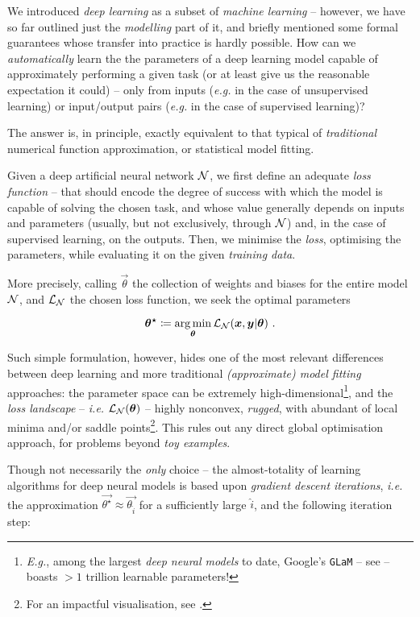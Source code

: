 We introduced \textit{deep learning} as a subset of \textit{machine learning} -- however, we have so far outlined just the \textit{modelling} part of it, and briefly mentioned some formal guarantees whose transfer into practice is hardly possible. How can we \textit{automatically} learn the the parameters of a deep learning model capable of approximately performing a given task (or at least give us the reasonable expectation it could) -- only from inputs (\textit{e.g.} in the case of unsupervised learning) or input/output pairs (\textit{e.g.} in the case of supervised learning)?

The answer is, in principle, exactly equivalent to that typical of \textit{traditional} numerical function approximation, or statistical model fitting.

Given a deep artificial neural network $\mathcal{N}$, we first define an adequate \textit{loss function} -- that should encode the degree of success with which the model is capable of solving the chosen task, and whose value generally depends on inputs and parameters (usually, but not exclusively, through $\mathcal{N}$) and, in the case of supervised learning, on the outputs. Then, we minimise the \textit{loss}, optimising \wrt the parameters, while evaluating it on the given \textit{training data}.

More precisely, calling $\vec{\theta}$ the collection of weights and biases for the entire model $\mathcal{N}$, and $\mathcal{L}_{\mathcal{N}}$ the chosen loss function, we seek the optimal parameters

$$\bm{\theta^{\star}} \coloneqq \operatorname*{arg\,min}_{\bm{\theta}} \mathcal{L}_{\mathcal{N}}(\bm{x}, \bm{y} | \bm{\theta}) \text{ .}$$

Such simple formulation, however, hides one of the most relevant differences between deep learning and more traditional \textit{(approximate) model fitting} approaches: the parameter space can be extremely high-dimensional\footnote{\textit{E.g.}, among the largest \textit{deep neural models} to date, Google's \texttt{GLaM} -- see \cite{DuEtAl2022GLaM} -- boasts $>1$ trillion learnable parameters!}, and the \textit{loss landscape} -- \textit{i.e.} $\mathcal{L}_{\mathcal{N}}(\bm{\theta})$ -- highly nonconvex, \textit{rugged}, with abundant of local minima and/or saddle points\footnote{For an impactful visualisation, see \cite{LiEtAl2018VisualizingLL}.}. This rules out any direct global optimisation approach, for problems beyond \textit{toy examples}.

Though not necessarily the \textit{only} choice -- the almost-totality of learning algorithms for deep neural models is based upon \textit{gradient descent iterations}, \textit{i.e.} the approximation $\vec{\theta^{\star}} \approx \vec{\theta_{\hat{i}}}$ for a sufficiently large $\hat{i}$, and the following iteration step:

